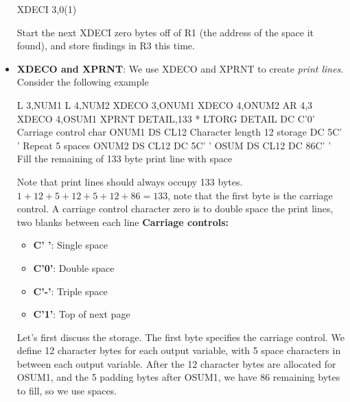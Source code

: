 \documentclass{report}
\begin{document}
\begin{itemize}
                    \begin{cppcode}
                    XDECI 3,0(1)
                    \end{cppcode}
                    \bigbreak \noindent 
                    Start the next XDECI zero bytes off of R1 (the address of the space it found), and store findings in R3 this time.
                \item \textbf{XDECO and XPRNT}: We use XDECO and XPRNT to create \textit{print lines}. Consider the following example
                    \bigbreak \noindent 
                    \begin{cppcode}
                            L      3,NUM1
                            L      4,NUM2
                            XDECO  3,ONUM1
                            XDECO  4,ONUM2
                            AR     4,3
                            XDECO  4,OSUM1
                            XPRNT  DETAIL,133
                    *
                            LTORG
                    DETAIL  DC     C'0'       Carriage control char
                    ONUM1   DS     CL12       Character length 12 storage
                            DC     5C' '      Repeat 5 spaces
                    ONUM2   DS     CL12
                            DC     5C' '
                    OSUM    DS     CL12
                            DC     86C' '     Fill the remaining of 133 byte print line with space
                    \end{cppcode}
                    \bigbreak \noindent 
                    Note that print lines should always occupy 133 bytes. $1 + 12 + 5 + 12 + 5 + 12 + 86 = 133$, note that the first byte is the carriage control. A carriage control character zero is to double space the print lines, two blanks between each line
                    \bigbreak \noindent 
                    \textbf{Carriage controls:}
                    \begin{itemize}
                        \item \textbf{C' '}: Single space 
                        \item \textbf{C'0'}: Double space 
                        \item \textbf{C'-'}: Triple space
                        \item \textbf{C'1'}: Top of next page
                    \end{itemize}
                    \bigbreak \noindent 
                    Let's first discuss the storage. The first byte specifies the carriage control. We define 12 character bytes for each output variable, with 5 space characters in between each output variable. After the 12 character bytes are allocated for OSUM1, and the 5 padding bytes after OSUM1, we have 86 remaining bytes to fill, so we use spaces.

\end{itemize}
\end{document}
